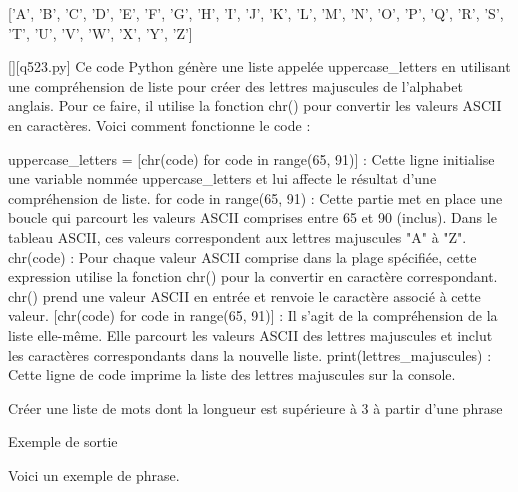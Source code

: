 ['A', 'B', 'C', 'D', 'E', 'F', 'G', 'H', 'I', 'J', 'K', 'L', 'M', 'N', 'O', 'P', 'Q', 'R', 'S', 'T', 'U', 'V', 'W', 'X', 'Y', 'Z']
        \par
        \begin{solution}
            \renewcommand{\nomfichier}{q523.py}
            \pythonfile{\chemincode \nomfichier}[][\nomfichier]
            Ce code Python génère une liste appelée uppercase\_letters en utilisant une compréhension de liste pour créer des lettres majuscules de l'alphabet anglais. Pour ce faire, il utilise la fonction chr() pour convertir les valeurs ASCII en caractères. Voici comment fonctionne le code :

    uppercase\_letters = [chr(code) for code in range(65, 91)] : Cette ligne initialise une variable nommée uppercase\_letters et lui affecte le résultat d'une compréhension de liste.
        for code in range(65, 91) : Cette partie met en place une boucle qui parcourt les valeurs ASCII comprises entre 65 et 90 (inclus). Dans le tableau ASCII, ces valeurs correspondent aux lettres majuscules "A" à "Z".
        chr(code) : Pour chaque valeur ASCII comprise dans la plage spécifiée, cette expression utilise la fonction chr() pour la convertir en caractère correspondant. chr() prend une valeur ASCII en entrée et renvoie le caractère associé à cette valeur.
        [chr(code) for code in range(65, 91)] : Il s'agit de la compréhension de la liste elle-même. Elle parcourt les valeurs ASCII des lettres majuscules et inclut les caractères correspondants dans la nouvelle liste.
    print(lettres\_majuscules) : Cette ligne de code imprime la liste des lettres majuscules sur la console.
        \end{solution}
        

        \question
        Créer une liste de mots dont la longueur est supérieure à 3 à partir d'une phrase

Exemple de sortie

Voici un exemple de phrase.

